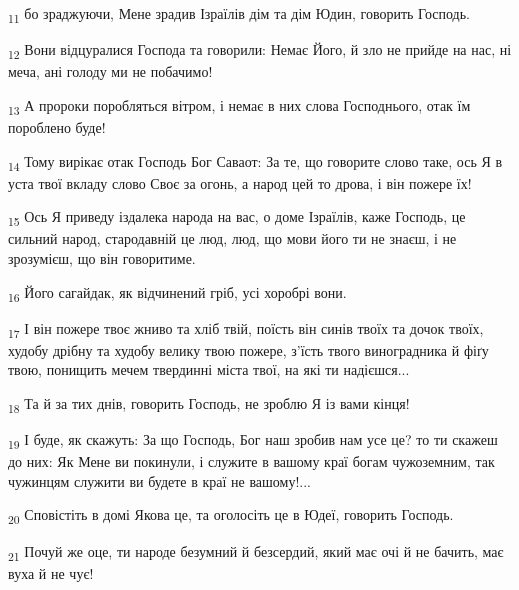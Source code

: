 \begin{tcolorbox}
\textsubscript{11} бо зраджуючи, Мене зрадив Ізраїлів дім та дім Юдин, говорить Господь.
\end{tcolorbox}
\begin{tcolorbox}
\textsubscript{12} Вони відцуралися Господа та говорили: Немає Його, й зло не прийде на нас, ні меча, ані голоду ми не побачимо!
\end{tcolorbox}
\begin{tcolorbox}
\textsubscript{13} А пророки поробляться вітром, і немає в них слова Господнього, отак їм пороблено буде!
\end{tcolorbox}
\begin{tcolorbox}
\textsubscript{14} Тому вирікає отак Господь Бог Саваот: За те, що говорите слово таке, ось Я в уста твої вкладу слово Своє за огонь, а народ цей то дрова, і він пожере їх!
\end{tcolorbox}
\begin{tcolorbox}
\textsubscript{15} Ось Я приведу іздалека народа на вас, о доме Ізраїлів, каже Господь, це сильний народ, стародавній це люд, люд, що мови його ти не знаєш, і не зрозумієш, що він говоритиме.
\end{tcolorbox}
\begin{tcolorbox}
\textsubscript{16} Його сагайдак, як відчинений гріб, усі хоробрі вони.
\end{tcolorbox}
\begin{tcolorbox}
\textsubscript{17} І він пожере твоє жниво та хліб твій, поїсть він синів твоїх та дочок твоїх, худобу дрібну та худобу велику твою пожере, з'їсть твого виноградника й фіґу твою, понищить мечем твердинні міста твої, на які ти надієшся...
\end{tcolorbox}
\begin{tcolorbox}
\textsubscript{18} Та й за тих днів, говорить Господь, не зроблю Я із вами кінця!
\end{tcolorbox}
\begin{tcolorbox}
\textsubscript{19} І буде, як скажуть: За що Господь, Бог наш зробив нам усе це? то ти скажеш до них: Як Мене ви покинули, і служите в вашому краї богам чужоземним, так чужинцям служити ви будете в краї не вашому!...
\end{tcolorbox}
\begin{tcolorbox}
\textsubscript{20} Сповістіть в домі Якова це, та оголосіть це в Юдеї, говорить Господь.
\end{tcolorbox}
\begin{tcolorbox}
\textsubscript{21} Почуй же оце, ти народе безумний й безсердий, який має очі й не бачить, має вуха й не чує!
\end{tcolorbox}
